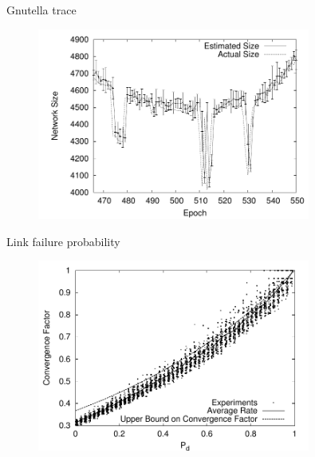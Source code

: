 \begin{frame}{Gnutella trace}

\begin{figure}
\includegraphics[width=0.80\textwidth]{subtrace}
\end{figure}

\end{frame}


\begin{frame}{Link failure probability}
	
\begin{figure}
\includegraphics[width=0.80\textwidth]{newscast-fail-sym}
\end{figure}

		
\end{frame}

